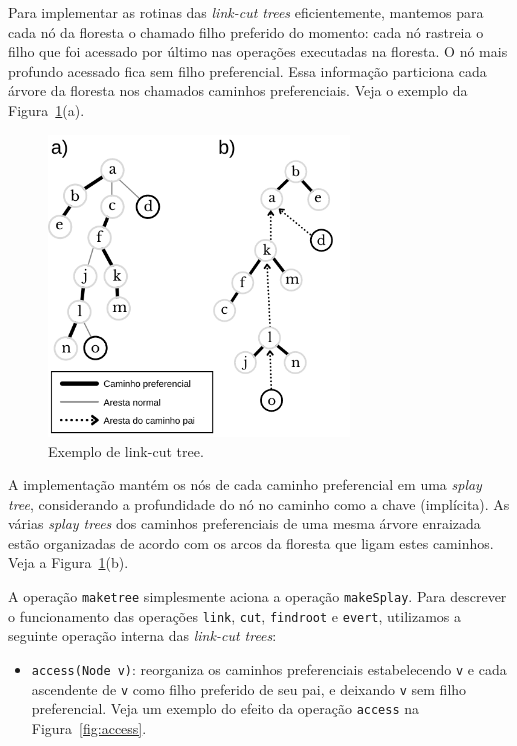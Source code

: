 Para implementar as rotinas das \emph{link-cut trees} eficientemente, mantemos para cada nó da floresta o chamado filho preferido do momento: cada nó rastreia o filho que foi acessado por último nas operações executadas na floresta. O nó mais profundo acessado fica sem filho preferencial. Essa informação particiona cada árvore da floresta nos chamados caminhos preferenciais. Veja o exemplo da Figura~\ref{fig:lct}(a).  

\begin{figure}[htb]
    \centering
    \includegraphics[width=8cm]{lct-and-represented-tree2.png}
    \caption{Exemplo de link-cut tree.}\label{fig:lct}
\end{figure}

A implementação mantém os nós de cada caminho preferencial em uma \emph{splay tree}, considerando a profundidade do nó no caminho como a chave (implícita).  
As várias \emph{splay trees} dos caminhos preferenciais de uma mesma árvore enraizada estão organizadas de acordo com os arcos da floresta que ligam estes caminhos. Veja a Figura~\ref{fig:lct}(b).  

A operação \texttt{maketree} simplesmente aciona a operação \texttt{makeSplay}. Para descrever o funcionamento das operações \texttt{link}, \texttt{cut}, \texttt{findroot} e \texttt{evert}, utilizamos a seguinte operação interna das \emph{link-cut trees}:  

\begin{itemize}
    \item \texttt{access(Node v)}: reorganiza os caminhos preferenciais estabelecendo \texttt{v} e cada ascendente de \texttt{v} como filho preferido de seu pai, e deixando \texttt{v} sem filho preferencial. Veja um exemplo do efeito da operação \texttt{access} na Figura~\ref{fig:access}.  
\end{itemize}


